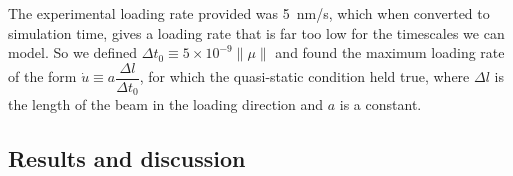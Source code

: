 The experimental loading rate provided was \SI{5}{\nano\metre/\second}, which when converted to simulation time, gives a loading rate that is far too low for the timescales we can model. So we defined $\Delta t_0 \equiv 5\times 10^{-9} \lVert\mu\rVert$ and found the maximum loading rate of the form $\dot{u} \equiv a \dfrac{\Delta l}{\Delta t_0}$, for which the quasi-static condition held true, where $\Delta l$ is the length of the beam in the loading direction and $a$ is a constant.






\subsection{Results and discussion}

